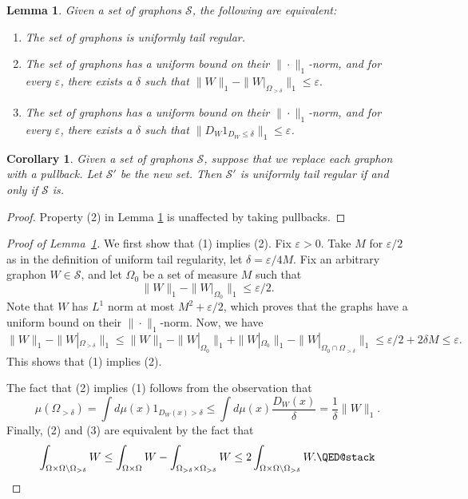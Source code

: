 \documentclass{amsart}
\numberwithin{equation}{section}
\numberwithin{figure}{section}
\newtheorem{lemma}[theorem]{Lemma}
\newtheorem{corollary}[theorem]{Corollary}
\theoremstyle{definition}
\theoremstyle{remark}
\newcommand{\cS}{\mathcal{S}}
\begin{document}
\begin{lemma} \label{lemuniftailregequiv}
Given a set of graphons $\cS$, the following are equivalent:
\begin{enumerate}
\item The set of graphons is uniformly tail regular.
\item The set of graphons has a uniform bound on their $\|\cdot\|_1$-norm,
    and for every $\varepsilon$, there exists a $\delta$ such that $
 \|W\|_1 - \|W|_{\Omega_{> \delta}}\|_1 \le \varepsilon. $
\item The set of graphons has a uniform bound on their $\|\cdot\|_1$-norm,
    and for every $\varepsilon$, there exists a $\delta$ such that $
 \|D_W1_{D_W\leq \delta}\|_1\leq \varepsilon $.

\end{enumerate}
\end{lemma}

\begin{corollary} \label{coruniftailregpullback}
Given a set of graphons $\cS$, suppose that we replace each graphon with a
pullback. Let $\cS'$ be the new set. Then $\cS'$ is uniformly tail regular
if and only if $\cS$ is.
\end{corollary}

\begin{proof}
Property (2) in Lemma \ref{lemuniftailregequiv} is unaffected by taking
pullbacks.
\end{proof}

\begin{proof}[Proof of Lemma~\ref{lemuniftailregequiv}]
We first show that (1) implies (2). Fix $\varepsilon>0$. Take $M$ for
$\varepsilon/2$ as in the definition of uniform tail regularity, let
$\delta=\varepsilon/4M$.  Fix an arbitrary graphon $W \in \cS$, and let
$\Omega_0$ be a set of measure $M$ such that
\[\|W\|_1 - \|W|_{\Omega_0}\|_1 \le \varepsilon/2
.\] Note that $W$ has $L^1$ norm at most $M^2+\varepsilon/2$, which
proves that the graphs have a uniform bound on their $\|\cdot\|_1$-norm. Now,
we have
\[\|W\|_1 - \|W|_{\Omega_{> \delta}}\|_1 \le \|W\|_1 - \|W|_{\Omega_0}\|_1+\|W|_{\Omega_0}\|_1 - \|W|_{\Omega_0 \cap \Omega_{> \delta}}\|_1 \le \varepsilon/2 + 2\delta M \le \varepsilon
.\]
This shows that (1) implies (2).

The fact that (2) implies (1) follows from the observation that
\[
\mu(\Omega_{>\delta})=\int d\mu(x)1_{D_W(x)> \delta}\leq \int d\mu(x) \frac{D_W(x)}\delta
=\frac 1\delta\|W\|_1.
\]
Finally, (2) and (3) are equivalent by the fact that
\[
\int_{\Omega\times\Omega\setminus\Omega_{>\delta}}W
\leq \int_{\Omega\times\Omega} W - \int_{\Omega_{>\delta}\times\Omega_{>\delta}} W
\leq 2 \int_{\Omega\times\Omega\setminus\Omega_{>\delta}}W. \qedhere
\]
\end{proof}
\end{document}
